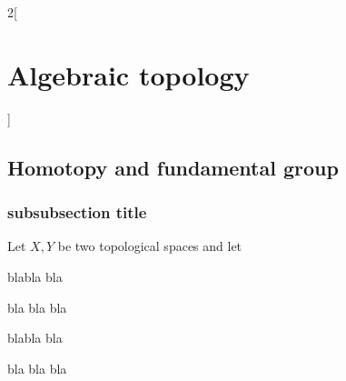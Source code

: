 \documentclass[../../../main.tex]{subfiles}
\begin{document}
\renewcommand{\col}{\geo}
\begin{multicols}{2}[\section{Algebraic topology}]
  \subsection{Homotopy and fundamental group}
  \subsubsection{subsubsection title}
  \begin{definition}
  	Let $X,Y$ be two topological spaces and let
  \end{definition}
  \begin{theorem}
    blabla bla
  \end{theorem}
  \begin{lemma}
    bla bla bla
  \end{lemma}
  \begin{proposition}
    blabla bla
  \end{proposition}
  \begin{corollary}
    bla bla bla
  \end{corollary}
\end{multicols}
\end{document}

